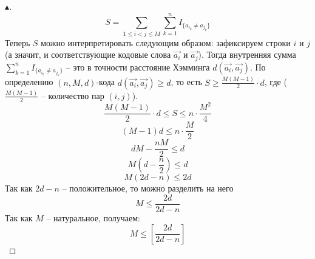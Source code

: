 \begin{theorem}
\begin{proof}[$\blacktriangle$]
        $$
        S = \sum \limits_{1 \leq i < j \leq M} \sum \limits_{k=1}^{n} I_{ \{ a_{i_{k}} \neq a_{j_{k}} \} }
        $$
        Теперь $S$ можно интерпретировать следующим образом: зафиксируем строки $i$ и $j$ (а значит, и соответствующие кодовые слова $\Vec{a_i}$ и $\Vec{a_j}$). Тогда внутренняя сумма $\sum \limits_{k=1}^{n} I_{ \{ a_{i_{k}} \neq a_{j_{k}} \} }$ -- это в точности расстояние Хэмминга $d(\Vec{a_i}, \Vec{a_j})$. По определению $(n, M, d)$-кода $d(\Vec{a_i}, \Vec{a_j}) \geq d$, то есть $S \geq \frac{M(M-1)}{2} \cdot d$, где ($\frac{M(M-1)}{2}$ -- количество пар $(i, j)$).\\
        $$
            \frac{M(M-1)}{2} \cdot d \leq S \leq n \cdot \frac{M^2}{4}
        $$
        $$
            (M - 1)d \leq n \cdot \frac{M}{2}
        $$
        $$
            dM - \frac{nM}{2} \leq d
        $$
        $$
            M(d - \frac{n}{2}) \leq d
        $$
        $$
            M(2d - n) \leq 2d
        $$
        Так как $2d - n$ -- положительное, то можно разделить на него
        $$
            M \leq \frac{2d}{2d - n}
        $$
        Так как $M$ -- натуральное, получаем:
        $$
            M \leq \left[ \frac{2d}{2d - n} \right]
        $$
    \end{proof}
\end{theorem}